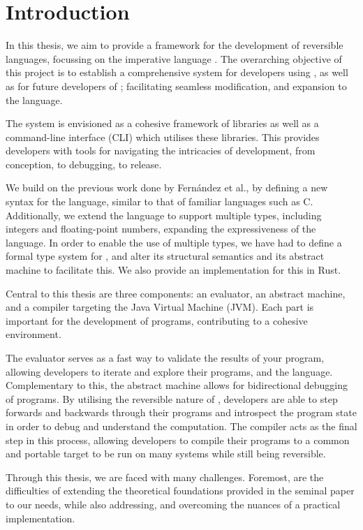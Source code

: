 \chapter{Introduction}

In this thesis, we aim to provide a framework for the development of reversible languages, focussing on the imperative language \rimplang. The overarching objective of this project is to establish a comprehensive system for developers using \rimplang, as well as for future developers of \rimplang; facilitating seamless modification, and expansion to the language. 

The system is envisioned as a cohesive framework of libraries as well as a command-line interface (CLI) which utilises these libraries. This provides developers with tools for navigating the intricacies of development, from conception, to debugging, to release.

We build on the previous work done by Fern{\'a}ndez et al.\cite{Rimp}, by defining a new syntax for the language, similar to that of familiar languages such as C. Additionally, we extend the language to support multiple types, including integers and floating-point numbers, expanding the expressiveness of the language. In order to enable the use of multiple types, we have had to define a formal type system for \rimplang, and alter its structural semantics and its abstract machine to facilitate this. We also provide an implementation for this in Rust.

Central to this thesis are three components: an evaluator, an abstract machine, and a compiler targeting the Java Virtual Machine (JVM). Each part is important for the development of \rimplang programs, contributing to a cohesive environment.

The evaluator serves as a fast way to validate the results of your program, allowing developers to iterate and explore their programs, and the \rimplang language.
Complementary to this, the abstract machine allows for bidirectional debugging of \rimplang programs. By utilising the reversible nature of \rimplang, developers are able to step forwards and backwards through their programs and introspect the program state in order to debug and understand the computation. The compiler acts as the final step in this process, allowing developers to compile their programs to a common and portable target to be run on many systems while still being reversible.

Through this thesis, we are faced with many challenges. Foremost, are the difficulties of extending the theoretical foundations provided in the seminal \rimplang paper\cite{Rimp} to our needs, while also addressing, and overcoming the nuances of a practical implementation.
